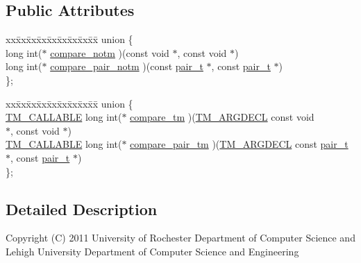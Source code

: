 \subsection*{Public Attributes}
\begin{DoxyCompactItemize}
\item 
\begin{tabbing}
xx\=xx\=xx\=xx\=xx\=xx\=xx\=xx\=xx\=\kill
union \{\\
\>long int($\ast$ \hyperlink{structcomparator_a04331fe4e35ed246b440524c309b9cab}{compare\_notm} )(const void $\ast$, const void $\ast$)\\
\>long int($\ast$ \hyperlink{structcomparator_a3712f9c1314343454595ff27c4723207}{compare\_pair\_notm} )(const \hyperlink{pair_8h_a22a04bbebcea6eb94a8adfaf49e4c0a6}{pair\_t} $\ast$, const \hyperlink{pair_8h_a22a04bbebcea6eb94a8adfaf49e4c0a6}{pair\_t} $\ast$)\\
\}; \\

\end{tabbing}\item 
\begin{tabbing}
xx\=xx\=xx\=xx\=xx\=xx\=xx\=xx\=xx\=\kill
union \{\\
\>\hyperlink{tm_8h_adf0341d9b0d169f1aba20257caed702e}{TM\_CALLABLE} long int($\ast$ \hyperlink{structcomparator_a272b38f55e10cd75a0c919a66706c8fc}{compare\_tm} )(\hyperlink{tm_8h_ae33cc3e793f29d38bc95aadf88d1b6f8}{TM\_ARGDECL} const void \\
\>\>$\ast$, const void $\ast$)\\
\>\hyperlink{tm_8h_adf0341d9b0d169f1aba20257caed702e}{TM\_CALLABLE} long int($\ast$ \hyperlink{structcomparator_a5f55648532ae36dc726ded03479d7eb9}{compare\_pair\_tm} )(\hyperlink{tm_8h_ae33cc3e793f29d38bc95aadf88d1b6f8}{TM\_ARGDECL} const \hyperlink{pair_8h_a22a04bbebcea6eb94a8adfaf49e4c0a6}{pair\_t} \\
\>\>$\ast$, const \hyperlink{pair_8h_a22a04bbebcea6eb94a8adfaf49e4c0a6}{pair\_t} $\ast$)\\
\}; \\

\end{tabbing}\end{DoxyCompactItemize}


\subsection{Detailed Description}
Copyright (C) 2011 University of Rochester Department of Computer Science and Lehigh University Department of Computer Science and Engineering

